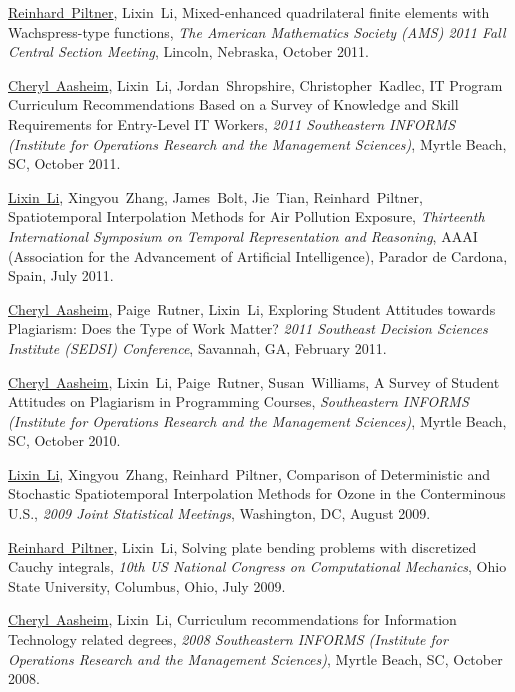 \documentclass[10pt]{article}
\def\u{\underline}
\begin{document}
\begin{bibenum}
\item \u{Reinhard~Piltner}, Lixin~Li, 
Mixed-enhanced quadrilateral finite elements with Wachspress-type functions,
{\it The American Mathematics Society (AMS) 2011 Fall Central Section Meeting},
Lincoln, Nebraska, October 2011.

\item  \u{Cheryl~Aasheim}, Lixin~Li, Jordan~Shropshire, Christopher~Kadlec, 
IT Program Curriculum Recommendations Based on a Survey of Knowledge 
and Skill Requirements for Entry-Level IT Workers,  {\it 2011 
Southeastern INFORMS (Institute for Operations Research and the Management Sciences)}, 
Myrtle Beach, SC, October 2011.

\item \u{Lixin~Li},  Xingyou~Zhang, James~Bolt, Jie~Tian, Reinhard~Piltner,
Spatiotemporal Interpolation Methods for Air Pollution Exposure, 
{\it Thirteenth International Symposium on Temporal Representation and Reasoning},
AAAI (Association for the Advancement of Artificial Intelligence), Parador de Cardona, Spain, July 2011.

\item \u{Cheryl~Aasheim}, Paige~Rutner, Lixin~Li, 
Exploring Student Attitudes towards Plagiarism: Does the Type of Work Matter? 
{\it 2011 Southeast Decision Sciences Institute (SEDSI) Conference}, 
Savannah, GA, February 2011.

\item \u{Cheryl~Aasheim}, Lixin~Li, Paige~Rutner, Susan~Williams, 
A Survey of Student Attitudes on Plagiarism in Programming Courses, 
{\it Southeastern INFORMS (Institute for Operations 
Research and the Management Sciences)}, Myrtle Beach, SC, 
October 2010.

\item \u{Lixin~Li},  Xingyou~Zhang, Reinhard~Piltner, 
Comparison of Deterministic and Stochastic Spatiotemporal Interpolation Methods for Ozone in the Conterminous U.S., 
{\it 2009 Joint Statistical Meetings}, Washington, DC, August 2009.

\item \u{Reinhard~Piltner}, Lixin~Li, 
Solving plate bending problems with discretized Cauchy integrals,
{\it 10th US National Congress on Computational Mechanics},
Ohio State University, Columbus, Ohio, July 2009.

\item \u{Cheryl~Aasheim}, Lixin~Li, Curriculum recommendations for 
Information Technology related degrees, {\it 2008 
Southeastern INFORMS (Institute for Operations Research and 
the Management Sciences)}, Myrtle Beach, SC, October 2008.


\end{bibenum}
\end{document}
